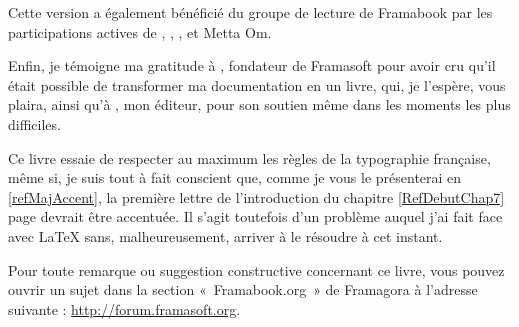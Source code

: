\begin{Remerciements}
Cette version a également bénéficié du groupe de lecture de Framabook par les participations actives de , , ,  et Metta Om.\par
Enfin, je témoigne ma gratitude à , fondateur de Framasoft pour avoir cru qu'il était possible de transformer ma documentation en un livre, qui, je l'espère, vous plaira, ainsi qu'à , mon éditeur, pour son soutien même dans les moments les plus difficiles.\par
Ce livre essaie de respecter au maximum les règles de la typographie française, même si, je suis tout à fait conscient que, comme je vous le présenterai en \ref{refMajAccent}, la première lettre de l'introduction du chapitre \ref{RefDebutChap7} page \pageref{RefDebutChap7} devrait être accentuée. Il s'agit toutefois d'un problème auquel j'ai fait face avec \LaTeX{} sans, malheureusement, arriver à le résoudre à cet instant.\par
Pour toute remarque ou suggestion constructive concernant ce livre, vous pouvez ouvrir un sujet dans la section «~Framabook.org~» de Framagora à l'adresse suivante : \url{http://forum.framasoft.org}.\par
\end{Remerciements}
